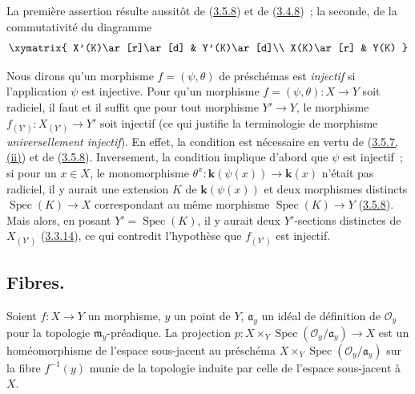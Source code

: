 La première assertion résulte aussitôt de
(\hyperref[I.3.5.8-fr]{3.5.8}) et de
(\hyperref[I.3.4.8-fr]{3.4.8})~; la seconde, de la commutativité du diagramme
\label{I.3.5.10.base-change-points-diagram-fr}
\[
  \xymatrix{
    X'(K)\ar[r]\ar[d] & Y'(K)\ar[d]\\
    X(K)\ar[r] & Y(K)
  }
\]

\begin{remark}[3.5.11]
\label{I.3.5.11-fr}
\upshape Nous dirons qu'un morphisme $f=(\psi,\theta)$ de préschémas est
\emph{injectif} si l'application $\psi$ est injective. Pour qu'un morphisme
$f=(\psi,\theta):X\to Y$ soit radiciel, il faut et il suffit que pour tout
morphisme $Y'\to Y$, le morphisme $f_{(Y')}:X_{(Y')}\to Y'$ soit injectif (ce
qui justifie la terminologie de morphisme \emph{universellement injectif}). En
effet, la condition est nécessaire en vertu de
(\hyperref[I.3.5.7-fr]{3.5.7, (ii)}) et de
(\hyperref[I.3.5.8-fr]{3.5.8}). Inversement, la condition implique d'abord que
$\psi$ est injectif~; si pour un $x\in X$, le monomorphisme
$\theta^x:\boldsymbol{k}(\psi(x))\to\boldsymbol{k}(x)$ n'était pas radiciel, il y aurait une extension
$K$ de $\boldsymbol{k}(\psi(x))$ et deux morphismes distincts
$\operatorname{Spec}(K)\to X$ correspondant au même morphisme
$\operatorname{Spec}(K)\to Y$ (\hyperref[I.3.5.8-fr]{3.5.8}). Mais alors, en
posant $Y'=\operatorname{Spec}(K)$, il y aurait deux $Y'$-sections distinctes
de $X_{(Y')}$ (\hyperref[I.3.3.14-fr]{3.3.14}), ce qui contredit l'hypothèse
que $f_{(Y')}$ est injectif.
\end{remark}

\subsection{Fibres.}
\label{subsection:I.3.6-fr}

\begin{proposition}[3.6.1]
\label{I.3.6.1-fr}
Soient $f:X\to Y$ un morphisme, $y$ un point de $Y$, $\mathfrak{a}_y$ un
idéal de définition de $\mathcal{O}_y$ pour la topologie
$\mathfrak{m}_y$-préadique. La projection
$p:X\times_Y\operatorname{Spec}(\mathcal{O}_y/\mathfrak{a}_y)\to X$ est un
homéomorphisme de l'espace sous-jacent au préschéma
$X\times_Y\operatorname{Spec}(\mathcal{O}_y/\mathfrak{a}_y)$ sur la fibre
$f^{-1}(y)$ munie de la topologie induite par celle de l'espace sous-jacent à
$X$.
\end{proposition}

